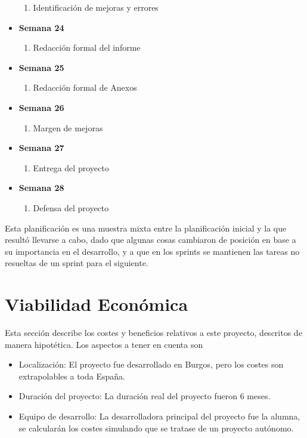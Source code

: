 \documentclass[a4paper,12pt,twoside]{memoir}
\begin{document}
\begin{itemize}
\begin{enumerate}
        \item Identificación de mejoras y errores
    \end{enumerate}
    \item \textbf{Semana 24}
    \begin{enumerate}
        \item Redacción formal del informe
    \end{enumerate}
    \item \textbf{Semana 25}
    \begin{enumerate}
        \item Redacción formal de Anexos
    \end{enumerate}
    \item \textbf{Semana 26}
    \begin{enumerate}
        \item Margen de mejoras
    \end{enumerate}
    \item \textbf{Semana 27}
    \begin{enumerate}
        \item Entrega del proyecto
    \end{enumerate}
    \item \textbf{Semana 28}
    \begin{enumerate}
        \item Defensa del proyecto
    \end{enumerate}
\end{itemize}

Esta planificación es una muestra mixta entre la planificación inicial y la que resultó llevarse a cabo, dado que algunas cosas cambiaron de posición en base a su importancia en el desarrollo, y a que en los sprints se mantienen las tareas no resueltas de un sprint para el siguiente.

\section{Viabilidad Económica}
Esta sección describe los costes y beneficios relativos a este proyecto, descritos de manera hipotética. Los aspectos a tener en cuenta son
\begin{itemize}
    \item Localización: El proyecto fue desarrollado en Burgos, pero los costes son extrapolables a toda España.
    \item Duración del proyecto: La duración real del proyecto fueron 6 meses.
    \item Equipo de desarrollo: La desarrolladora principal del proyecto fue la alumna, se calcularán los costes simulando que se tratase de un proyecto autónomo.
\end{itemize}
\end{document}
